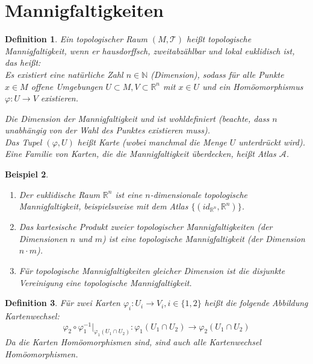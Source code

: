 \documentclass[a4paper]{scrreprt}
\numberwithin{equation}{chapter}
\newcommand{\R}{\mathds{R}}
\theoremstyle{plain}
\newtheorem{defn}{Definition}[section]
\newtheorem{bsp}[defn]{Beispiel}
\begin{document}
	\section{Mannigfaltigkeiten}
		\begin{defn}
			Ein topologischer Raum $(M,\mathcal{T})$ heißt topologische Mannigfaltigkeit, wenn er hausdorffsch, zweitabzählbar und lokal euklidisch ist, das heißt:\\
			Es existiert eine natürliche Zahl $n\in \mathds{N}$ (Dimension), sodass für alle Punkte $x\in M$ offene Umgebungen $U\subset M, V\subset \R^n$ mit $x\in U $ und ein Homöomorphismus $ \varphi:U\rightarrow V$ existieren.\par
			Die Dimension der Mannigfaltigkeit und ist wohldefiniert (beachte, dass $n$ unabhängig von der Wahl des Punktes existieren muss).\\
			Das Tupel $(\varphi,U)$ heißt Karte (wobei manchmal die Menge $U$ unterdrückt wird). Eine Familie von Karten, die die Mannigfaltigkeit überdecken, heißt Atlas $\mathcal{A}$.
		\end{defn}
		\begin{bsp}\hfill 
			\begin{enumerate}
				\item Der euklidische Raum $\R^n$ ist eine $n$-dimensionale topologische Mannigfaltigkeit, beispielsweise mit dem Atlas $\lbrace (id_{\R^n},\R^n)\rbrace$. 
				\item Das kartesische Produkt zweier topologischer Mannigfaltigkeiten (der Dimensionen $n$ und $m$) ist eine topologische Mannigfaltigkeit (der Dimension $n\cdot m$).
				\item Für topologische Mannigfaltigkeiten gleicher Dimension ist die disjunkte Vereinigung eine topologische Mannigfaltigkeit.
			\end{enumerate}
		\end{bsp}
		\begin{defn}
			Für zwei Karten $\varphi_i:U_i\rightarrow V_i, i\in\lbrace 1,2 \rbrace$ heißt die folgende Abbildung Kartenwechsel:
			\begin{equation*}
				\varphi_2\circ\varphi_1^{-1}\vert_{\varphi_1(U_1\cap U_2)}:\varphi_1(U_1\cap U_2)\rightarrow \varphi_2(U_1\cap U_2)
			\end{equation*}
			Da die Karten Homöomorphismen sind, sind auch alle Kartenwechsel Homöomorphismen.
		\end{defn} 
\end{document}
